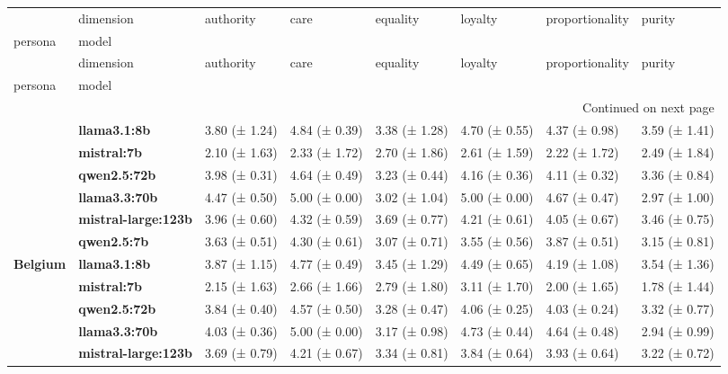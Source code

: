 \begin{longtable}{llllllll}
\toprule
 & dimension & authority & care & equality & loyalty & proportionality & purity \\
persona & model &  &  &  &  &  &  \\
\midrule
\endfirsthead
\toprule
 & dimension & authority & care & equality & loyalty & proportionality & purity \\
persona & model &  &  &  &  &  &  \\
\midrule
\endhead
\midrule
\multicolumn{8}{r}{Continued on next page} \\
\midrule
\endfoot
\bottomrule
\endlastfoot
\multirow[t]{6}{*}{\textbf{Argentina}} & \textbf{llama3.1:8b} & 3.80 (± 1.24) & 4.84 (± 0.39) & 3.38 (± 1.28) & 4.70 (± 0.55) & 4.37 (± 0.98) & 3.59 (± 1.41) \\
\textbf{} & \textbf{mistral:7b} & 2.10 (± 1.63) & 2.33 (± 1.72) & 2.70 (± 1.86) & 2.61 (± 1.59) & 2.22 (± 1.72) & 2.49 (± 1.84) \\
\textbf{} & \textbf{qwen2.5:72b} & 3.98 (± 0.31) & 4.64 (± 0.49) & 3.23 (± 0.44) & 4.16 (± 0.36) & 4.11 (± 0.32) & 3.36 (± 0.84) \\
\textbf{} & \textbf{llama3.3:70b} & 4.47 (± 0.50) & 5.00 (± 0.00) & 3.02 (± 1.04) & 5.00 (± 0.00) & 4.67 (± 0.47) & 2.97 (± 1.00) \\
\textbf{} & \textbf{mistral-large:123b} & 3.96 (± 0.60) & 4.32 (± 0.59) & 3.69 (± 0.77) & 4.21 (± 0.61) & 4.05 (± 0.67) & 3.46 (± 0.75) \\
\textbf{} & \textbf{qwen2.5:7b} & 3.63 (± 0.51) & 4.30 (± 0.61) & 3.07 (± 0.71) & 3.55 (± 0.56) & 3.87 (± 0.51) & 3.15 (± 0.81) \\
\cline{1-8}
\multirow[t]{6}{*}{\textbf{Belgium}} & \textbf{llama3.1:8b} & 3.87 (± 1.15) & 4.77 (± 0.49) & 3.45 (± 1.29) & 4.49 (± 0.65) & 4.19 (± 1.08) & 3.54 (± 1.36) \\
\textbf{} & \textbf{mistral:7b} & 2.15 (± 1.63) & 2.66 (± 1.66) & 2.79 (± 1.80) & 3.11 (± 1.70) & 2.00 (± 1.65) & 1.78 (± 1.44) \\
\textbf{} & \textbf{qwen2.5:72b} & 3.84 (± 0.40) & 4.57 (± 0.50) & 3.28 (± 0.47) & 4.06 (± 0.25) & 4.03 (± 0.24) & 3.32 (± 0.77) \\
\textbf{} & \textbf{llama3.3:70b} & 4.03 (± 0.36) & 5.00 (± 0.00) & 3.17 (± 0.98) & 4.73 (± 0.44) & 4.64 (± 0.48) & 2.94 (± 0.99) \\
\textbf{} & \textbf{mistral-large:123b} & 3.69 (± 0.79) & 4.21 (± 0.67) & 3.34 (± 0.81) & 3.84 (± 0.64) & 3.93 (± 0.64) & 3.22 (± 0.72) \\

\end{longtable}
